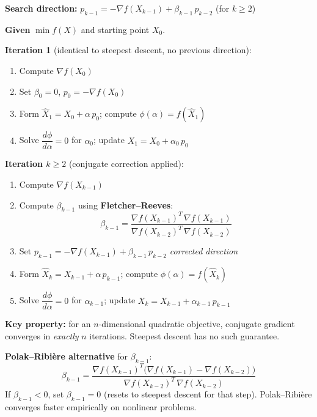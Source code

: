 \documentclass[10pt,a4paper]{article}
\newenvironment{algbox}{%
  \begin{mdframed}[backgroundcolor=boxbg, linewidth=0.6pt,
    innertopmargin=6pt, innerbottommargin=6pt,
    innerleftmargin=8pt, innerrightmargin=8pt]
}{%
  \end{mdframed}
}
\newenvironment{notebox}{%
  \begin{mdframed}[backgroundcolor=notebg, linewidth=0.6pt,
    innertopmargin=4pt, innerbottommargin=4pt,
    innerleftmargin=8pt, innerrightmargin=8pt]
}{%
  \end{mdframed}
}
\begin{document}
\textbf{Search direction:} $p_{k-1} = -\nabla f(X_{k-1}) + \beta_{k-1}\, p_{k-2}$ \quad (for $k \geq 2$)

\begin{algbox}
\textbf{Given} $\min f(X)$ and starting point $X_0$.

\medskip
\textbf{Iteration 1} (identical to steepest descent, no previous direction):
\begin{enumerate}
  \item Compute $\nabla f(X_0)$
  \item Set $\beta_0 = 0$, \quad $p_0 = -\nabla f(X_0)$
  \item Form $\hat{X}_1 = X_0 + \alpha\, p_0$; \quad compute $\phi(\alpha) = f(\hat{X}_1)$
  \item Solve $\dfrac{d\phi}{d\alpha} = 0$ for $\alpha_0$; \quad update $X_1 = X_0 + \alpha_0\, p_0$
\end{enumerate}

\medskip
\textbf{Iteration $k \geq 2$} (conjugate correction applied):
\begin{enumerate}
  \item Compute $\nabla f(X_{k-1})$
  \item Compute $\beta_{k-1}$ using \textbf{Fletcher--Reeves}:
    \[
      \beta_{k-1} = \frac{\nabla f(X_{k-1})^T\, \nabla f(X_{k-1})}{\nabla f(X_{k-2})^T\, \nabla f(X_{k-2})}
    \]
  \item Set $p_{k-1} = -\nabla f(X_{k-1}) + \beta_{k-1}\, p_{k-2}$ \hfill\textit{corrected direction}
  \item Form $\hat{X}_k = X_{k-1} + \alpha\, p_{k-1}$; \quad compute $\phi(\alpha) = f(\hat{X}_k)$
  \item Solve $\dfrac{d\phi}{d\alpha} = 0$ for $\alpha_{k-1}$; \quad update $X_k = X_{k-1} + \alpha_{k-1}\, p_{k-1}$
\end{enumerate}
\end{algbox}

\begin{notebox}
\textbf{Key property:} for an $n$-dimensional quadratic objective, conjugate gradient converges in
\emph{exactly} $n$ iterations. Steepest descent has no such guarantee.

\smallskip
\textbf{Polak--Ribi\`ere alternative} for $\beta_{k-1}$:
\[
  \beta_{k-1} = \frac{\nabla f(X_{k-1})^T\bigl(\nabla f(X_{k-1}) - \nabla f(X_{k-2})\bigr)}
                     {\nabla f(X_{k-2})^T\, \nabla f(X_{k-2})}
\]
If $\beta_{k-1} < 0$, set $\beta_{k-1} = 0$ (resets to steepest descent for that step).
Polak--Ribi\`ere converges faster empirically on nonlinear problems.
\end{notebox}
\end{document}
